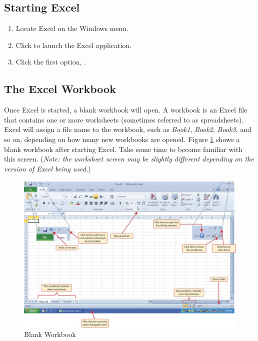 \subsection{Starting Excel}

\begin{enumerate}
	\item Locate Excel on the Windows menu.
	\item Click  to launch the Excel application.
	\item Click the first option, .
\end{enumerate}

\subsection{The Excel Workbook}

Once Excel is started, a blank workbook will open. A workbook is an Excel file that contains one or more worksheets (sometimes referred to as spreadsheets). Excel will assign a file name to the workbook, such as \textit{Book1}, \textit{Book2}, \textit{Book3}, and so on, depending on how many new workbooks are opened. Figure \ref{01:fig02} shows a blank workbook after starting Excel. Take some time to become familiar with this screen. (\textit{Note: the worksheet screen may be slightly different depending on the version of Excel being used.})

\begin{figure}[H]
	\centering
	\includegraphics[width=\maxwidth{.95\linewidth}]{gfx/ch01_fig02}
	\caption{Blank Workbook}
	\label{01:fig02}
\end{figure}

